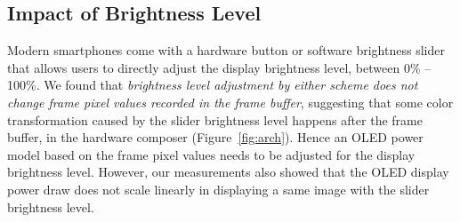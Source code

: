 % 
% 
% 
% 

\subsection{Impact of Brightness Level}
\label{subsec:brightness}

Modern smartphones come with a hardware button or software brightness
slider that allows users to directly adjust the display brightness
level, \eg between 0\% -- 100\%.  We found that {\em brightness level
  adjustment by either scheme does not change frame pixel values
  recorded in the frame buffer}, 
suggesting that some color transformation
caused by the slider brightness level happens after the frame
buffer, \ie in the hardware composer (Figure~\ref{fig:arch}). 
Hence an OLED power model based on the frame pixel values needs to be
adjusted for the display brightness level.
However, our measurements also showed that 
the OLED display power draw does not scale linearly in displaying a same image
with the slider brightness level.

